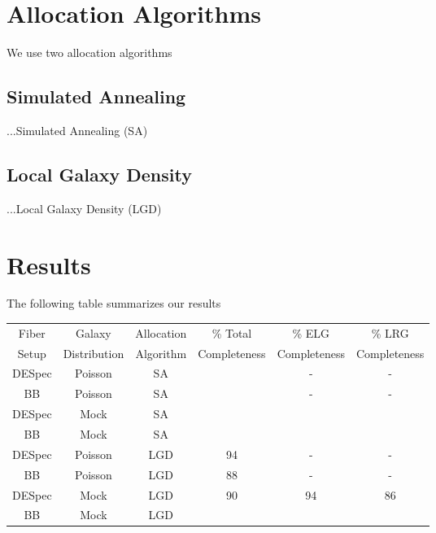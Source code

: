 \documentclass{article}
\begin{document}
\section{Allocation Algorithms}

We use two allocation algorithms

\subsection{Simulated Annealing}
...Simulated Annealing (SA)

\subsection{Local Galaxy Density}
...Local Galaxy Density (LGD)

\section{Results}

The following table summarizes our results

\begin{table}
\begin{tabular}{cccccc}\hline
Fiber & Galaxy & Allocation & \% Total & \% ELG & \% LRG\\
Setup & Distribution & Algorithm & Completeness & Completeness& Completeness\\\hline
DESpec & Poisson & SA & & -& -\\
BB & Poisson & SA & & -& -\\
DESpec & Mock & SA & & &\\
BB & Mock & SA & & &\\
DESpec & Poisson & LGD & 94 & -& -\\
BB & Poisson & LGD & 88& -&-\\
DESpec & Mock & LGD & 90 & 94 & 86\\
BB & Mock & LGD & & &\\\hline
\end{tabular}
\label{Summary of the results.}
\end{table}
\end{document}
